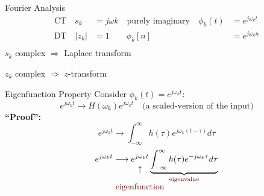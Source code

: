 \begin{frame}{Fourier Analysis}
\begin{align*}
  \text{CT}\quad s_k &= j\omega k\quad \text{purely imaginary} \quad \phi_k(t) &= e^{j\omega_k t}\\
  \text{DT}\quad |z_k| &= 1\quad \text{} \quad \phi_k[n] &= e^{j\omega_k n}\\
\end{align*}
$s_k$ complex $\Rightarrow$  Laplace transform\par
$z_k$ complex $\Rightarrow$ $z$-transform

\end{frame}

\begin{frame}{Eigenfunction Property}
    Consider $\phi_k(t) = e^{j\omega_k t}$:
    \begin{equation*}
        e^{j\omega_k t} \longrightarrow H(\omega_k) e^{j\omega_k t} \quad \text{(a scaled-version of the input)}
    \end{equation*}
    \textbf{``Proof'':}\pause
    {
        \begin{equation*}
            e^{j\omega_k t} \longrightarrow \int_{-\infty}^{\infty}h(\tau)e^{j\omega_k (t-\tau)}d\tau
        \end{equation*}
        \pause
        \begin{equation*}
            e^{j\omega_k t} \longrightarrow
            \underset{\mathclap{\tikz \node {$\uparrow$} node [below=3ex, text=red!40!black] {eigenfunction};}}{
            e^{j\omega_k t}
            }
            \underbrace{
            \int_{-\infty}^{\infty} h(\tau)e^{-j\omega_k \tau}d\tau
            }_{\textcolor{red!40!black}{\text{eigenvalue}}}
        \end{equation*}
    }
\end{frame}


